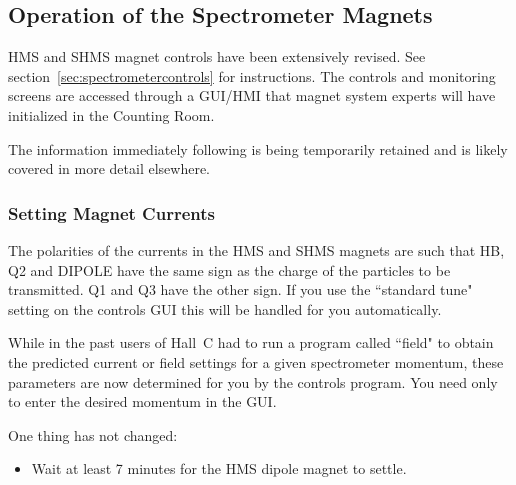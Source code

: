 \subsection{Operation of the Spectrometer Magnets}
\label{ssec:operatemagnets}

HMS and SHMS magnet controls have been extensively revised. See
section~\ref{sec:spectrometercontrols}
for instructions. The controls and
monitoring screens are accessed through a GUI/HMI that magnet system 
experts will have initialized in the Counting Room. 

The information immediately following is being temporarily retained and is likely
covered in more detail elsewhere.

\subsubsection{Setting Magnet Currents}

The polarities of the currents in the HMS and SHMS magnets are such that
HB, Q2 and DIPOLE have the same sign as the charge of the particles
to be transmitted. Q1 and Q3 have the other sign. If you use the ``standard
tune" setting on the controls GUI this will be handled for you automatically.

While in the past users of Hall~C had to run a program called ``field" to obtain
the predicted current or field settings for a given spectrometer momentum,
these parameters are now determined for you by the controls program. You
need only to enter the desired momentum in the GUI.

One thing has not changed:
\begin{itemize}
\item{Wait at least 7 minutes for the HMS dipole magnet to settle.}
\end{itemize}

